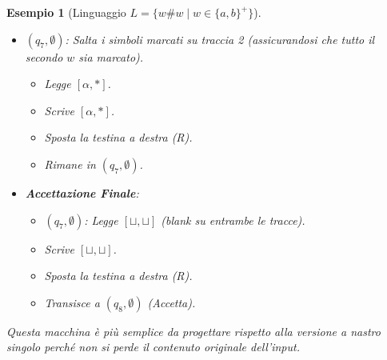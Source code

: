 \documentclass[a4paper]{article}
\newtheorem{example}{Esempio}
\begin{document}
\begin{example}[Linguaggio $L = \{w\#w \mid w \in \{a,b\}^+\}$]
\begin{itemize}
\begin{itemize}
\begin{itemize}
\begin{itemize}
                            \item Transisce a $(q_7, \emptyset)$.
                        \end{itemize}
                    \item $(q_7, \emptyset)$: Salta i simboli marcati su traccia 2 (assicurandosi che tutto il secondo $w$ sia marcato).
                        \begin{itemize}
                            \item Legge $[\alpha, *]$.
                            \item Scrive $[\alpha, *]$.
                            \item Sposta la testina a destra (R).
                            \item Rimane in $(q_7, \emptyset)$.
                        \end{itemize}
                    \item \textbf{Accettazione Finale}:
                        \begin{itemize}
                            \item $(q_7, \emptyset)$: Legge $[\sqcup, \sqcup]$ (blank su entrambe le tracce).
                            \item Scrive $[\sqcup, \sqcup]$.
                            \item Sposta la testina a destra (R).
                            \item Transisce a $(q_8, \emptyset)$ (Accetta).
                        \end{itemize}
                \end{itemize}
        \end{itemize}
\end{itemize}
Questa macchina è più semplice da progettare rispetto alla versione a nastro singolo perché non si perde il contenuto originale dell'input.
\end{example}
\end{document}
